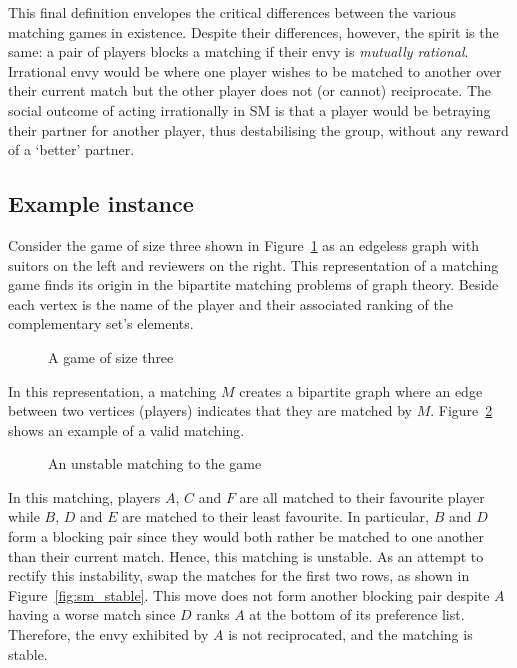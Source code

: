 This final definition envelopes the critical differences between the various
matching games in existence. Despite their differences, however, the spirit is
the same: a pair of players blocks a matching if their envy is \emph{mutually
rational}. Irrational envy would be where one player wishes to be matched to
another over their current match but the other player does not (or cannot)
reciprocate. The social outcome of acting irrationally in SM is that a player
would be betraying their partner for another player, thus destabilising the
group, without any reward of a `better' partner.

\subsection{Example instance}

Consider the game of size three shown in Figure~\ref{fig:sm_matching} as an
edgeless graph with suitors on the left and reviewers on the right. This
representation of a matching game finds its origin in the bipartite matching
problems of graph theory. Beside each vertex is the name of the player and their
associated ranking of the complementary set’s elements.

\begin{figure}[htbp]
    \centering
    
    \caption{A game of size three}\label{fig:sm_matching}
\end{figure}

In this representation, a matching \(M\) creates a bipartite graph where an edge
between two vertices (players) indicates that they are matched by \(M\).
Figure~\ref{fig:sm_unstable} shows an example of a valid matching.

\begin{figure}[htbp]
    \centering
    
    \caption{An unstable matching to the game}\label{fig:sm_unstable}
\end{figure}

In this matching, players \(A\), \(C\) and \(F\) are all matched to their
favourite player while \(B\), \(D\) and \(E\) are matched to their least
favourite. In particular, \(B\) and \(D\) form a blocking pair since they would
both rather be matched to one another than their current match. Hence, this
matching is unstable. As an attempt to rectify this instability, swap the
matches for the first two rows, as shown in Figure~\ref{fig:sm_stable}. This
move does not form another blocking pair despite \(A\) having a worse match
since \(D\) ranks \(A\) at the bottom of its preference list. Therefore, the
envy exhibited by \(A\) is not reciprocated, and the matching is stable.

